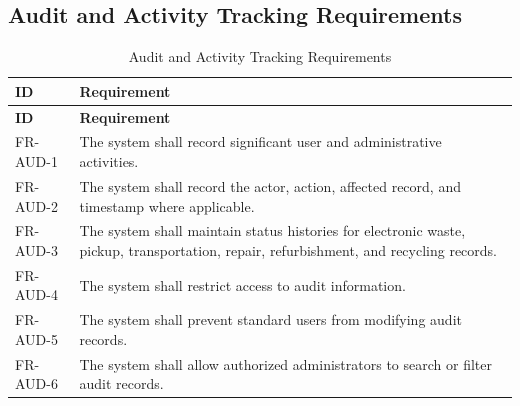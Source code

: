\subsection{Audit and Activity Tracking Requirements}
\begin{longtable}{@{}p{2.4cm}p{11cm}@{}}
\caption{Audit and Activity Tracking Requirements} \label{tab:fr-aud} \\
\toprule \textbf{ID} & \textbf{Requirement} \\ \midrule
\endfirsthead
\toprule \textbf{ID} & \textbf{Requirement} \\ \midrule
\endhead
FR-AUD-1 & The system shall record significant user and administrative activities. \\
FR-AUD-2 & The system shall record the actor, action, affected record, and timestamp where applicable. \\
FR-AUD-3 & The system shall maintain status histories for electronic waste, pickup, transportation, repair, refurbishment, and recycling records. \\
FR-AUD-4 & The system shall restrict access to audit information. \\
FR-AUD-5 & The system shall prevent standard users from modifying audit records. \\
FR-AUD-6 & The system shall allow authorized administrators to search or filter audit records. \\
\bottomrule
\end{longtable}

